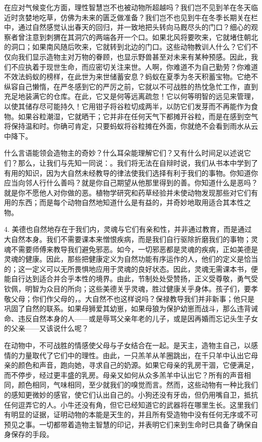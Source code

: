 在应对气候变化方面，理性智慧岂不也被动物所超越吗？我们岂不见到羊在冬天临近时贪婪地吃草，仿佛为未来的匮乏做准备？我们岂不也见到牛在冬季长期关在栏中，通过自然感觉认出春天的回归，并一致地把头转向马厩尽头的门口？细心的观察者曾注意到刺猬在其洞穴的两端各开一个口。如果北风将要吹来，它就堵住朝北的洞口；如果南风随后吹来，它就转到北边的门口。这些动物教训人什么？它们不仅向我们显示造物主对万物的眷顾，也显示野兽甚至对未来有某种预感。因此，我们不应执着于现世生命，而应密切关注来世。人啊，你难道不为自己勤劳？你难道不效法蚂蚁的榜样，在此世为来世储蓄安息？蚂蚁在夏季为冬天积蓄宝物。它绝不纵容自己懒惰，在严冬感到它的严厉之前，它就以不可战胜的热忱急忙工作，直到充足地装满它的仓库。在此，它又是何等远离疏忽！它以何等明智的远见来管理，以使其储存尽可能持久！它用钳子将谷粒切成两半，以防它们发芽而不再能作为食物。如果谷粒潮湿，它就晒干；它并非在任何天气下都摊开谷粒，而是在感到空气将保持温和时。你确可肯定，只要蚂蚁将谷粒摊在外面，你就绝不会看到雨水从云中降下。\par

什么言语能领会造物主的奇妙？什么耳朵能理解它们？又有什么时间足以述说它们？那么，让我们与先知一同说：。我们将无法在自辩时说，我们从书本中学到了有用的知识，因为大自然未经教导的律法使我们选择有利于我们的事物。你知道你应当向邻人行什么善吗？就是你自己期望从他那里得到的善。你知道什么是恶吗？就是你不愿他人对你做的恶。植物学研究和药草经验并未使动物发现那些对它们有用的东西；而是每个动物自然地知道什么是有益的，并奇妙地取用适合其本性之物。\par

4. 美德也自然地存在于我们内，灵魂与它们有亲和性，并非通过教育，而是通过大自然本身。我们不需要课本来憎恨疾病，而是我们自行驱除折磨我们的事物；灵魂不需要师傅来教导我们避免邪恶。如今，一切邪恶都是灵魂的疾病，正如美德是灵魂的健康。因此，那些把健康定义为自然功能有序运作的人，他们的定义是恰当的；这一定义可以无所畏惧地应用于灵魂的良好状态。因此，灵魂无需课本书，便能自行达到适合并合乎本性的境界。由此，节制处处受赞扬，正义受尊敬，勇气受钦佩，明智为众目的所向；这些美德关乎灵魂，胜过健康关乎身体。孩子们，要孝敬父母；你们作父母的，。大自然不也这样说吗？保禄教导我们并非新事；他只是巩固了自然的联系。如果母狮爱其幼崽，如果母狼为保护幼崽而战斗，那么违背诫命、违反自然本身的人——或是辱骂父亲年老的儿子，或是因再婚而忘记头生子女的父亲——又该说什么呢？\par

在动物中，不可战胜的情感使父母与子女结合在一起。是天主，造物主自己，以感情的力量取代了它们中的理性。由此，一只羔羊从羊圈跳出，在千只羊中认出它母亲的颜色和声音，跑向她，寻求自己的奶源。如果它母亲的乳房干涸，它便满足，而不停步，经过更丰盛的乳房。母亲又如何从众多羔羊中认出它？所有的声音相同，颜色相同，气味相同，至少就我们的嗅觉而言。然而，这些动物有一种比我们的感知更微妙的感官，使它们认出自己的。小狗还没有牙齿，但仍用嘴自卫，抵抗任何逗弄它的人。小牛还没有角，但它已经知道它的武器将在哪里生长。这里我们有明显的证据，证明动物的本能是天生的，并且所有受造物中没有任何无序或不可预见之事。一切都带着造物主智慧的印记，并表明它们来到生命时已具备了确保自身保存的手段。\par

